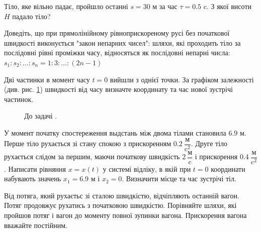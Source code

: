 \justifying
\begin{problem}{1}
	Тіло, яке вільно падає, пройшло останні $s = 30$ м за час $\tau = 0.5$ c. З якої висоти $H$ падало тіло?
\end{problem}

\begin{problem}{2}
	Доведіть, що при прямолінійному рівноприскореному русі без початкової швидкості виконується "закон непарних чисел": шляхи, які проходить тіло за послідовні рівні проміжки часу, відносяться як послідовні непарні числа: $s_1: s_2:\dots :s_n = 1:3:\dots :(2n-1)$
\end{problem}

\begin{problem}{3}
	Дві частинки в момент часу $t=0$ вийшли з однієї точки. За графіком залежності (див. рис. \ref{particles}) швидкості від часу визначте координату та час нової зустрічі частинок.
	
	\begin{figure}[h!]
		\centering
		
		\caption{До задачі .}
		\label{particles}
	\end{figure}
\end{problem}

\begin{problem}{4}
	У момент початку спостереження выдстань між двома тілами становила $6.9$ м. Перше тіло рухається зі стану спокою з прискоренням $0.2 ~\dfrac{\text{м}}{\text{c}^2}$. Друге тіло рухається слідом за першим, маючи  початкову швидкість $2 ~\dfrac{\text{м}}{\text{c}}$ і прискорення $0.4 ~\dfrac{\text{м}}{\text{c}^2}$. Написати рівняння $x = x(t)$ у системі відліку, в якій при $t = 0$ координати набувають значень $x_1 = 6.9$ м і $x_2 = 0$. Визначити місце та час зустрічі тіл.
\end{problem}

\begin{problem}{4}
	Від потяга, який рухаєтьс зі сталою швидкістю, відчіпляють останній вагон. Потяг продовжує рухатись з початковою швидкістю. Порівняйте шляхи, які пройшов потяг і вагон до моменту повної зупинки вагона. Прискорення вагона вважайте постійним.
\end{problem}

